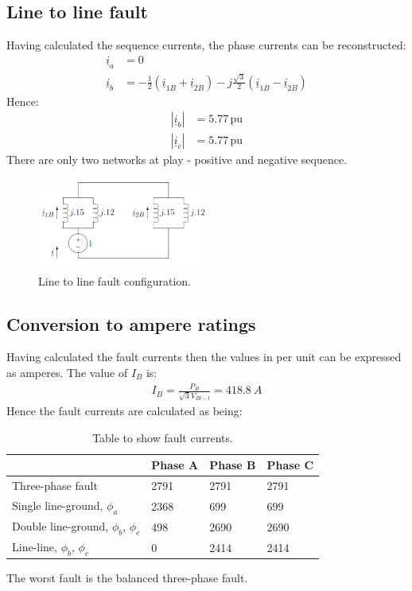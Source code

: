 \documentclass[class=report, crop=false, 12pt,a4paper]{standalone}
\begin{document}
\subsection{Line to line fault}
Having calculated the sequence currents, the phase currents can be reconstructed:
\begin{align}
	\underline{i}_a &= 0\\
	\underline{i}_b &= -\frac{1}{2}\left(\underline{i}_{1B}+ \underline{i}_{2B}\right) - j\frac{\sqrt{3}}{2}\left(\underline{i}_{1B}-\underline{i}_{2B}\right)
\end{align}
Hence:
\begin{align}
	\left|\underline{i}_{b}\right| &= 5.77\, \textrm{pu}\\
	\left|\underline{i}_{c}\right| &= 5.77\, \textrm{pu}
\end{align}
There are only two networks at play - positive and negative sequence.
\begin{figure}[H]
	\centering
	\includegraphics[width = 0.5\textwidth]{../img/figure44.png}
	\caption{Line to line fault configuration.}
\end{figure}
\subsection{Conversion to ampere ratings}
Having calculated the fault currents then the values in per unit can be expressed as amperes. The value of $I_B$ is:
\begin{gather}
	I_B = \frac{P_B}{\sqrt{3}V_{Bl-l}} = \SI{418.8}{A}
\end{gather}
Hence the fault currents are calculated as being:
\begin{table}
	\centering
	\begin{tabular}{@{}llll@{}}
		\toprule
		& Phase A & Phase B & Phase C\\
		\midrule
		Three-phase fault & 2791 & 2791 & 2791\\
		Single line-ground, $\phi_a$ & 2368 & 699 & 699\\
		Double line-ground, $\phi_b$, $\phi_c$ & 498 & 2690 & 2690\\
		Line-line, $\phi_b$, $\phi_c$ & 0 & 2414 & 2414\\
		\bottomrule
	\end{tabular}
	\caption{Table to show fault currents.}
\end{table}
The worst fault is the balanced three-phase fault.
\end{document}
